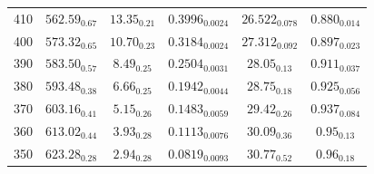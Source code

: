 \documentclass[journal=jctc,manuscript=article]{achemso}
\begin{document}
\begin{table}[htb!]
\begin{center}
\begin{tabular}{|c|c|c|c|c|c|}
			410 & $562.59_{0.67}$ & $13.35_{0.21}$ & $0.3996_{0.0024}$ & $26.522_{0.078}$ & $0.880_{0.014}$ \\
			400 & $573.32_{0.65}$ & $10.70_{0.23}$ & $0.3184_{0.0024}$ & $27.312_{0.092}$ & $0.897_{0.023}$ \\
			390 & $583.50_{0.57}$ & $8.49_{0.25}$ & $0.2504_{0.0031}$ & $28.05_{0.13}$ & $0.911_{0.037}$ \\
			380 & $593.48_{0.38}$ & $6.66_{0.25}$ & $0.1942_{0.0044}$ & $28.75_{0.18}$ & $0.925_{0.056}$ \\
			370 & $603.16_{0.41}$ & $5.15_{0.26}$ & $0.1483_{0.0059}$ & $29.42_{0.26}$ & $0.937_{0.084}$ \\
			360 & $613.02_{0.44}$ & $3.93_{0.28}$ & $0.1113_{0.0076}$ & $30.09_{0.36}$ & $0.95_{0.13}$ \\
			350 & $623.28_{0.28}$ & $2.94_{0.28}$ & $0.0819_{0.0093}$ & $30.77_{0.52}$ & $0.96_{0.18}$ \\
			\hline
		\end{tabular}
	\end{center}
\end{table}
\end{document}
